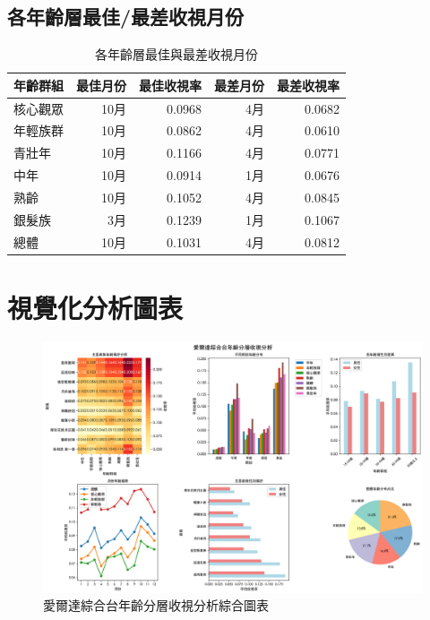 \documentclass[12pt,a4paper]{article}
\begin{document}
\subsection{各年齡層最佳/最差收視月份}

\begin{table}[H]
\centering
\caption{各年齡層最佳與最差收視月份}
\begin{tabular}{lrrrr}
\toprule
年齡群組 & 最佳月份 & 最佳收視率 & 最差月份 & 最差收視率 \\
\midrule
核心觀眾 & 10月 & 0.0968 & 4月 & 0.0682 \\
年輕族群 & 10月 & 0.0862 & 4月 & 0.0610 \\
青壯年 & 10月 & 0.1166 & 4月 & 0.0771 \\
中年 & 10月 & 0.0914 & 1月 & 0.0676 \\
熟齡 & 10月 & 0.1052 & 4月 & 0.0845 \\
銀髮族 & 3月 & 0.1239 & 1月 & 0.1067 \\
總體 & 10月 & 0.1031 & 4月 & 0.0812 \\

\bottomrule
\end{tabular}
\end{table}

\section{視覺化分析圖表}

\begin{figure}[H]
\centering
\includegraphics[width=\textwidth]{drama_age_analysis.png}
\caption{愛爾達綜合台年齡分層收視分析綜合圖表}
\label{fig:age_analysis}
\end{figure}
\end{document}
